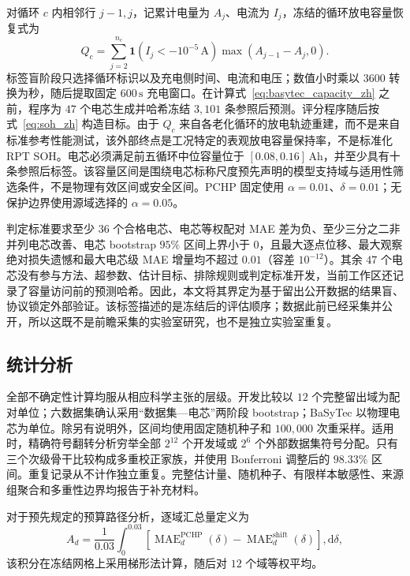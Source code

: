 \documentclass[UTF8,11pt]{ctexart}
\begin{document}
对循环 $c$ 内相邻行 $j-1,j$，记累计电量为 $A_j$、电流为 $I_j$，冻结的循环放电容量恢复式为
\begin{equation}
Q_c=\sum_{j=2}^{n_c}\mathbf{1}\!\left(I_j<-10^{-5}\,\mathrm{A}\right)
\max(A_{j-1}-A_j,0).
\label{eq:basytec_capacity_zh}
\end{equation}
标签盲阶段只选择循环标识以及充电侧时间、电流和电压；数值小时乘以 $3600$ 转换为秒，随后提取固定 $600\,\mathrm{s}$ 充电窗口。在计算式~\eqref{eq:basytec_capacity_zh} 之前，程序为 $47$ 个电芯生成并哈希冻结 $3{,}101$ 条参照后预测。评分程序随后按式~\eqref{eq:soh_zh} 构造目标。由于 $Q_c$ 来自各老化循环的放电轨迹重建，而不是来自标准参考性能测试，该外部终点是工况特定的表观放电容量保持率，不是标准化 RPT SOH。电芯必须满足前五循环中位容量位于 $[0.08,0.16]\,\mathrm{Ah}$，并至少具有十条参照后标签。该容量区间是围绕电芯标称尺度预先声明的模型支持域与适用性筛选条件，不是物理有效区间或安全区间。PCHP 固定使用 $\alpha=0.01$、$\delta=0.01$；无保护边界使用源域选择的 $\alpha=0.05$。

判定标准要求至少 $36$ 个合格电芯、电芯等权配对 MAE 差为负、至少三分之二非并列电芯改善、电芯 bootstrap $95\%$ 区间上界小于 $0$，且最大逐点位移、最大观察绝对损失遗憾和最大电芯级 MAE 增量均不超过 $0.01$（容差 $10^{-12}$）。其余 $47$ 个电芯没有参与方法、超参数、估计目标、排除规则或判定标准开发，当前工作区还记录了容量访问前的预测哈希。因此，本文将其界定为基于留出公开数据的结果盲、协议锁定外部验证。该标签描述的是冻结后的评估顺序；数据此前已经采集并公开，所以这既不是前瞻采集的实验室研究，也不是独立实验室重复。

\subsection{统计分析}

全部不确定性计算均服从相应科学主张的层级。开发比较以 \(12\) 个完整留出域为配对单位；六数据集确认采用“数据集—电芯”两阶段 bootstrap；BaSyTec 以物理电芯为单位。除另有说明外，区间均使用固定随机种子和 \(100{,}000\) 次重采样。适用时，精确符号翻转分析穷举全部 \(2^{12}\) 个开发域或 \(2^6\) 个外部数据集符号分配。只有三个次级骨干比较构成多重校正家族，并使用 Bonferroni 调整后的 \(98.33\%\) 区间。重复记录从不计作独立重复。完整估计量、随机种子、有限样本敏感性、来源组聚合和多重性边界均报告于补充材料。

对于预先规定的预算路径分析，逐域汇总量定义为
\begin{equation}
A_d=\frac{1}{0.03}\int_{0}^{0.03}
\left[\operatorname{MAE}^{\mathrm{PCHP}}_d(\delta)-
\operatorname{MAE}^{\mathrm{shift}}_d(\delta)\right],\mathrm d\delta,
\label{eq:budget_auc_zh}
\end{equation}
该积分在冻结网格上采用梯形法计算，随后对 \(12\) 个域等权平均。
\end{document}
